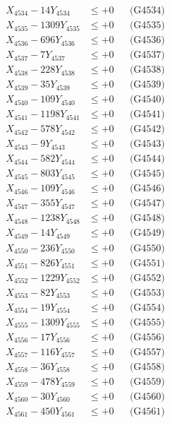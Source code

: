 \documentclass[a4paper,10pt]{article}
\begin{document}
{\begin{align}
X_{4534} - 14Y_{4534} &\leq +0 && \text{(G4534)} \\
X_{4535} - 1309Y_{4535} &\leq +0 && \text{(G4535)} \\
X_{4536} - 696Y_{4536} &\leq +0 && \text{(G4536)} \\
X_{4537} - 7Y_{4537} &\leq +0 && \text{(G4537)} \\
X_{4538} - 228Y_{4538} &\leq +0 && \text{(G4538)} \\
X_{4539} - 35Y_{4539} &\leq +0 && \text{(G4539)} \\
X_{4540} - 109Y_{4540} &\leq +0 && \text{(G4540)} \\
\allowbreak
X_{4541} - 1198Y_{4541} &\leq +0 && \text{(G4541)} \\
X_{4542} - 578Y_{4542} &\leq +0 && \text{(G4542)} \\
X_{4543} - 9Y_{4543} &\leq +0 && \text{(G4543)} \\
X_{4544} - 582Y_{4544} &\leq +0 && \text{(G4544)} \\
X_{4545} - 803Y_{4545} &\leq +0 && \text{(G4545)} \\
X_{4546} - 109Y_{4546} &\leq +0 && \text{(G4546)} \\
X_{4547} - 355Y_{4547} &\leq +0 && \text{(G4547)} \\
X_{4548} - 1238Y_{4548} &\leq +0 && \text{(G4548)} \\
X_{4549} - 14Y_{4549} &\leq +0 && \text{(G4549)} \\
X_{4550} - 236Y_{4550} &\leq +0 && \text{(G4550)} \\
\allowbreak
X_{4551} - 826Y_{4551} &\leq +0 && \text{(G4551)} \\
X_{4552} - 1229Y_{4552} &\leq +0 && \text{(G4552)} \\
X_{4553} - 82Y_{4553} &\leq +0 && \text{(G4553)} \\
X_{4554} - 19Y_{4554} &\leq +0 && \text{(G4554)} \\
X_{4555} - 1309Y_{4555} &\leq +0 && \text{(G4555)} \\
X_{4556} - 17Y_{4556} &\leq +0 && \text{(G4556)} \\
X_{4557} - 116Y_{4557} &\leq +0 && \text{(G4557)} \\
X_{4558} - 36Y_{4558} &\leq +0 && \text{(G4558)} \\
X_{4559} - 478Y_{4559} &\leq +0 && \text{(G4559)} \\
X_{4560} - 30Y_{4560} &\leq +0 && \text{(G4560)} \\
\allowbreak
X_{4561} - 450Y_{4561} &\leq +0 && \text{(G4561)} \\

\end{align}}
\end{document}
